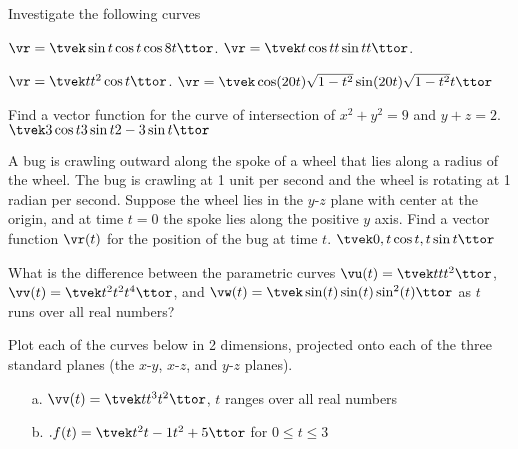 \begin{multicols}{2}


\problem Investigate the following curves %

\subprob $\vr =\tvek \sin t\\ \cos t\\ \cos 8t\ttor$.
\hfill
\subprob
$\vr =\tvek t\cos t\\ t\sin t\\ t\ttor$.

\subprob
$\vr =\tvek t\\ t^2\\ \cos t\ttor$.
\hfill
\subprob
$\vr =\tvek \cos(20t)\sqrt{1-t^2}\\ \sin(20t)\sqrt{1-t^2}\\ t\ttor$

\problem Find a vector function for the curve of intersection of %
$x^2+y^2=9$ and $y+z=2$.
\answer
$\tvek 3\cos t\\  3\sin t\\  2-3\sin t\ttor$
\endanswer

\problem A bug is crawling outward along the spoke of a wheel that lies along a %
radius of the wheel. The bug is crawling at 1 unit per second and the wheel is
rotating at 1 radian per second. Suppose the wheel lies in the $y$-$z$ plane
with center at the origin, and at time $t=0$ the spoke lies along the positive
$y$ axis. Find a vector function $\vr (t)$ for the position of the bug at
time $t$.
\answer
$\tvek 0,t\cos t,t\sin t\ttor$
\endanswer

\problem What is the difference between the parametric curves %
$\vu(t)=\tvek t\\ t\\ t^2 \ttor$, $\vv(t)=\tvek t^2\\ t^2\\ t^4 \ttor$, and
$\vw(t)=\tvek \sin(t)\\ \sin(t)\\ \sin^2(t) \ttor$ as $t$
runs over all real numbers?

\problem Plot each of the curves below in 2 dimensions, projected onto each of %
the three standard planes (the $x$-$y$, $x$-$z$, and $y$-$z$ planes).

\begin{itemize}
\item[a.] $\vv(t)=\tvek t\\  t^3\\  t^2 \ttor$,  $t$ ranges over all real numbers
\item[b.] $.f(t)=\tvek t^2\\  t-1\\  t^2+5 \ttor$  for $0\leq t \leq 3$
\end{itemize}


\end{multicols}
